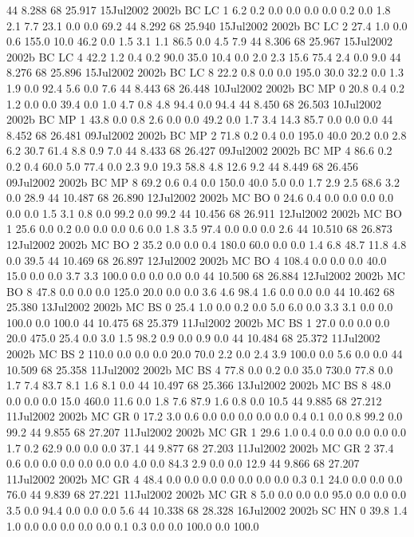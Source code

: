 44 8.288	68 25.917	15Jul2002	2002b	BC	LC	1	6.2	0.2	0.0	0.0	0.0	0.0	0.2	0.0	1.8	2.1	7.7	23.1	0.0	0.0	69.2
44 8.292	68 25.940	15Jul2002	2002b	BC	LC	2	27.4	1.0	0.0	0.6	155.0	10.0	46.2	0.0	1.5	3.1	1.1	86.5	0.0	4.5	7.9
44 8.306	68 25.967	15Jul2002	2002b	BC	LC	4	42.2	1.2	0.4	0.2	90.0	35.0	10.4	0.0	2.0	2.3	15.6	75.4	2.4	0.0	9.0
44 8.276	68 25.896	15Jul2002	2002b	BC	LC	8	22.2	0.8	0.0	0.0	195.0	30.0	32.2	0.0	1.3	1.9	0.0	92.4	5.6	0.0	7.6
44 8.443	68 26.448	10Jul2002	2002b	BC	MP	0	20.8	0.4	0.2	1.2	0.0	0.0	39.4	0.0	1.0	4.7	0.8	4.8	94.4	0.0	94.4
44 8.450	68 26.503	10Jul2002	2002b	BC	MP	1	43.8	0.0	0.8	2.6	0.0	0.0	49.2	0.0	1.7	3.4	14.3	85.7	0.0	0.0	0.0
44 8.452	68 26.481	09Jul2002	2002b	BC	MP	2	71.8	0.2	0.4	0.0	195.0	40.0	20.2	0.0	2.8	6.2	30.7	61.4	8.8	0.9	7.0
44 8.433	68 26.427	09Jul2002	2002b	BC	MP	4	86.6	0.2	0.2	0.4	60.0	5.0	77.4	0.0	2.3	9.0	19.3	58.8	4.8	12.6	9.2
44 8.449	68 26.456	09Jul2002	2002b	BC	MP	8	69.2	0.6	0.4	0.0	150.0	40.0	5.0	0.0	1.7	2.9	2.5	68.6	3.2	0.0	28.9
44 10.487	68 26.890	12Jul2002	2002b	MC	BO	0	24.6	0.4	0.0	0.0	0.0	0.0	0.0	0.0	1.5	3.1	0.8	0.0	99.2	0.0	99.2
44 10.456	68 26.911	12Jul2002	2002b	MC	BO	1	25.6	0.0	0.2	0.0	0.0	0.0	0.6	0.0	1.8	3.5	97.4	0.0	0.0	0.0	2.6
44 10.510	68 26.873	12Jul2002	2002b	MC	BO	2	35.2	0.0	0.0	0.4	180.0	60.0	0.0	0.0	1.4	6.8	48.7	11.8	4.8	0.0	39.5
44 10.469	68 26.897	12Jul2002	2002b	MC	BO	4	108.4	0.0	0.0	0.0	40.0	15.0	0.0	0.0	3.7	3.3	100.0	0.0	0.0	0.0	0.0
44 10.500	68 26.884	12Jul2002	2002b	MC	BO	8	47.8	0.0	0.0	0.0	125.0	20.0	0.0	0.0	3.6	4.6	98.4	1.6	0.0	0.0	0.0
44 10.462	68 25.380	13Jul2002	2002b	MC	BS	0	25.4	1.0	0.0	0.2	0.0	5.0	6.0	0.0	3.3	3.1	0.0	0.0	100.0	0.0	100.0
44 10.475	68 25.379	11Jul2002	2002b	MC	BS	1	27.0	0.0	0.0	0.0	20.0	475.0	25.4	0.0	3.0	1.5	98.2	0.9	0.0	0.9	0.0
44 10.484	68 25.372	11Jul2002	2002b	MC	BS	2	110.0	0.0	0.0	0.0	20.0	70.0	2.2	0.0	2.4	3.9	100.0	0.0	5.6	0.0	0.0
44 10.509	68 25.358	11Jul2002	2002b	MC	BS	4	77.8	0.0	0.2	0.0	35.0	730.0	77.8	0.0	1.7	7.4	83.7	8.1	1.6	8.1	0.0
44 10.497	68 25.366	13Jul2002	2002b	MC	BS	8	48.0	0.0	0.0	0.0	15.0	460.0	11.6	0.0	1.8	7.6	87.9	1.6	0.8	0.0	10.5
44 9.885	68 27.212	11Jul2002	2002b	MC	GR	0	17.2	3.0	0.6	0.0	0.0	0.0	0.0	0.0	0.4	0.1	0.0	0.8	99.2	0.0	99.2
44 9.855	68 27.207	11Jul2002	2002b	MC	GR	1	29.6	1.0	0.4	0.0	0.0	0.0	0.0	0.0	1.7	0.2	62.9	0.0	0.0	0.0	37.1
44 9.877	68 27.203	11Jul2002	2002b	MC	GR	2	37.4	0.6	0.0	0.0	0.0	0.0	0.0	0.0	4.0	0.0	84.3	2.9	0.0	0.0	12.9
44 9.866	68 27.207	11Jul2002	2002b	MC	GR	4	48.4	0.0	0.0	0.0	0.0	0.0	0.0	0.0	0.3	0.1	24.0	0.0	0.0	0.0	76.0
44 9.839	68 27.221	11Jul2002	2002b	MC	GR	8	5.0	0.0	0.0	0.0	95.0	0.0	0.0	0.0	3.5	0.0	94.4	0.0	0.0	0.0	5.6
44 10.338	68 28.328	16Jul2002	2002b	SC	HN	0	39.8	1.4	1.0	0.0	0.0	0.0	0.0	0.0	0.1	0.3	0.0	0.0	100.0	0.0	100.0
